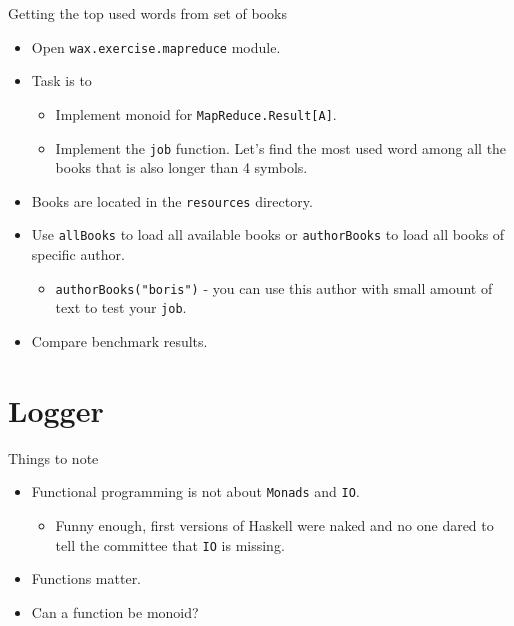\documentclass[presentation,aspectratio=169,smaller]{beamer}
\begin{document}
\begin{frame}[label={sec:orgbdc92b6},fragile]{Getting the top used words from set of books}
 \begin{itemize}
\item Open \texttt{wax.exercise.mapreduce} module.
\item Task is to
\begin{itemize}
\item Implement monoid for \texttt{MapReduce.Result[A]}.
\item Implement the \texttt{job} function. Let's find the most used word among all the
books that is also longer than 4 symbols.
\end{itemize}
\item Books are located in the \texttt{resources} directory.
\item Use \texttt{allBooks} to load all available books or \texttt{authorBooks} to load all books
of specific author.
\begin{itemize}
\item \texttt{authorBooks("boris")} - you can use this author with small amount of text
to test your \texttt{job}.
\end{itemize}
\item Compare benchmark results.
\end{itemize}
\end{frame}

\section*{Logger}
\label{sec:org64ba26d}

\begin{frame}[label={sec:org0ec6011},fragile]{Things to note}
 \begin{itemize}
\item Functional programming is not about \texttt{Monads} and \texttt{IO}.
\begin{itemize}
\item Funny enough, first versions of Haskell were naked and no one dared to tell
the committee that \texttt{IO} is missing.
\end{itemize}
\item Functions matter.
\end{itemize}

\pause

\begin{itemize}
\item Can a function be monoid?
\end{itemize}
\end{frame}
\end{document}
